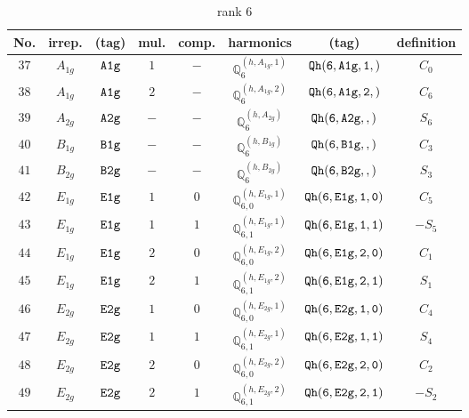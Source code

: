 \documentclass[fleqn,8pt]{jsarticle}
\begin{document}
\begin{table}[ht!]
\begin{center}
\caption{rank 6}
\renewcommand{\arraystretch}{1.3}
\begin{tabular}{cccccccc} \hline \hline
No. & irrep. & (tag) & mul. & comp. & harmonics & (tag) & definition \\ \hline
$ 37 $ & $ A_{1g} $ & $ {\tt A1g} $ & $ 1 $ & $ - $ & $ \mathbb{Q}_{6}^{(h,A_{1g},1)} $ & $ {\tt Qh(6,A1g,1,)} $ & $ C_{0} $ \\
$ 38 $ & $ A_{1g} $ & $ {\tt A1g} $ & $ 2 $ & $ - $ & $ \mathbb{Q}_{6}^{(h,A_{1g},2)} $ & $ {\tt Qh(6,A1g,2,)} $ & $ C_{6} $ \\
$ 39 $ & $ A_{2g} $ & $ {\tt A2g} $ & $ - $ & $ - $ & $ \mathbb{Q}_{6}^{(h,A_{2g})} $ & $ {\tt Qh(6,A2g,,)} $ & $ S_{6} $ \\
$ 40 $ & $ B_{1g} $ & $ {\tt B1g} $ & $ - $ & $ - $ & $ \mathbb{Q}_{6}^{(h,B_{1g})} $ & $ {\tt Qh(6,B1g,,)} $ & $ C_{3} $ \\
$ 41 $ & $ B_{2g} $ & $ {\tt B2g} $ & $ - $ & $ - $ & $ \mathbb{Q}_{6}^{(h,B_{2g})} $ & $ {\tt Qh(6,B2g,,)} $ & $ S_{3} $ \\
$ 42 $ & $ E_{1g} $ & $ {\tt E1g} $ & $ 1 $ & $ 0 $ & $ \mathbb{Q}_{6,0}^{(h,E_{1g},1)} $ & $ {\tt Qh(6,E1g,1,0)} $ & $ C_{5} $ \\
$ 43 $ & $ E_{1g} $ & $ {\tt E1g} $ & $ 1 $ & $ 1 $ & $ \mathbb{Q}_{6,1}^{(h,E_{1g},1)} $ & $ {\tt Qh(6,E1g,1,1)} $ & $ - S_{5} $ \\
$ 44 $ & $ E_{1g} $ & $ {\tt E1g} $ & $ 2 $ & $ 0 $ & $ \mathbb{Q}_{6,0}^{(h,E_{1g},2)} $ & $ {\tt Qh(6,E1g,2,0)} $ & $ C_{1} $ \\
$ 45 $ & $ E_{1g} $ & $ {\tt E1g} $ & $ 2 $ & $ 1 $ & $ \mathbb{Q}_{6,1}^{(h,E_{1g},2)} $ & $ {\tt Qh(6,E1g,2,1)} $ & $ S_{1} $ \\
$ 46 $ & $ E_{2g} $ & $ {\tt E2g} $ & $ 1 $ & $ 0 $ & $ \mathbb{Q}_{6,0}^{(h,E_{2g},1)} $ & $ {\tt Qh(6,E2g,1,0)} $ & $ C_{4} $ \\
$ 47 $ & $ E_{2g} $ & $ {\tt E2g} $ & $ 1 $ & $ 1 $ & $ \mathbb{Q}_{6,1}^{(h,E_{2g},1)} $ & $ {\tt Qh(6,E2g,1,1)} $ & $ S_{4} $ \\
$ 48 $ & $ E_{2g} $ & $ {\tt E2g} $ & $ 2 $ & $ 0 $ & $ \mathbb{Q}_{6,0}^{(h,E_{2g},2)} $ & $ {\tt Qh(6,E2g,2,0)} $ & $ C_{2} $ \\
$ 49 $ & $ E_{2g} $ & $ {\tt E2g} $ & $ 2 $ & $ 1 $ & $ \mathbb{Q}_{6,1}^{(h,E_{2g},2)} $ & $ {\tt Qh(6,E2g,2,1)} $ & $ - S_{2} $ \\
 \hline \hline
\end{tabular}
\end{center}
\end{table}
\end{document}
